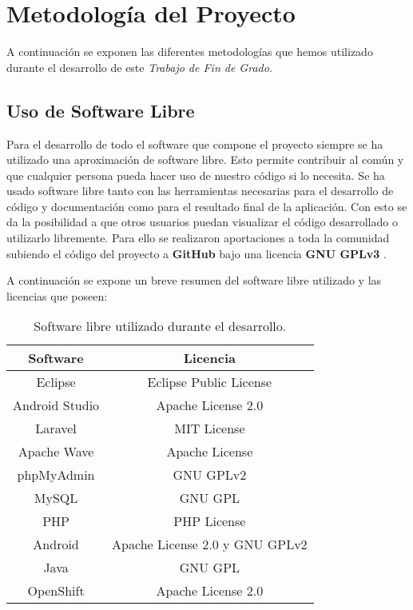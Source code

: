 \newpage
\thispagestyle{sectioned}
\chapter{Metodología del Proyecto}

A continuación se exponen las diferentes metodologías que hemos utilizado durante el desarrollo de este \textit{Trabajo de Fin de Grado}.

\section{Uso de Software Libre}

Para el desarrollo de todo el software que compone el proyecto siempre se ha utilizado una aproximación de software libre. Esto permite contribuir al común y que cualquier persona pueda hacer uso de nuestro código si lo necesita. Se ha usado software libre tanto con las herramientas necesarias para el desarrollo de código y documentación como para el resultado final de la aplicación. Con esto se da la posibilidad a que otros usuarios puedan visualizar el código desarrollado o utilizarlo libremente. Para ello se realizaron aportaciones a toda la comunidad subiendo el código del proyecto a \textbf{GitHub} bajo una licencia \textbf{GNU GPLv3} \cite{ref:GPLv3}.

A continuación se expone un breve resumen del software libre utilizado y las licencias que poseen:

\begin{table}[h]
\centering
\begin{tabular}{|c|c|}
\hline
{\bf Software} & {\bf Licencia}                 \\ \hline
Eclipse        & Eclipse Public License         \\ \hline
Android Studio & Apache License 2.0             \\ \hline
Laravel        & MIT License                    \\ \hline
Apache Wave    & Apache License                 \\ \hline
phpMyAdmin     & GNU GPLv2                      \\ \hline
MySQL          & GNU GPL                        \\ \hline
PHP            & PHP License                    \\ \hline
Android        & Apache License 2.0 y GNU GPLv2 \\ \hline
Java           & GNU GPL                        \\ \hline
OpenShift      & Apache License 2.0             \\ \hline
\end{tabular}
\caption{Software libre utilizado durante el desarrollo.}
\end{table}

